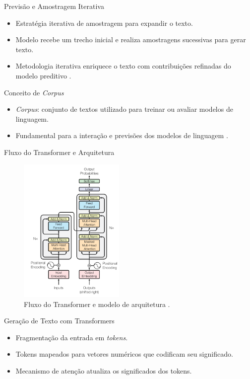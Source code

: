 \documentclass{beamer}
\begin{document}
\begin{frame}{Previsão e Amostragem Iterativa}
    \begin{itemize}
        \item Estratégia iterativa de amostragem para expandir o texto.
        \item Modelo recebe um trecho inicial e realiza amostragens sucessivas para gerar texto.
        \item Metodologia iterativa enriquece o texto com contribuições refinadas do modelo preditivo \cite{holtzman2019curious}.
    \end{itemize}
\end{frame}

\begin{frame}{Conceito de \textit{Corpus}}
    \begin{itemize}
        \item \textit{Corpus}: conjunto de textos utilizado para treinar ou avaliar modelos de linguagem.
        \item Fundamental para a interação e previsões dos modelos de linguagem \cite{Foundations-of-Statistical-Natural-Language-Processing}.
    \end{itemize}
\end{frame}

\begin{frame}{Fluxo do Transformer e Arquitetura}
    \begin{figure}[!h]
        \centering
        \includegraphics[width=2in]{images/The Transformer - model architecture.png}
        \caption{Fluxo do Transformer e modelo de arquitetura \cite{Attention-Is-All-You-Need}.}
        \label{fig:arquiteturaTransformer}
    \end{figure}
\end{frame}

\begin{frame}{Geração de Texto com Transformers}
    \begin{itemize}
        \item Fragmentação da entrada em \textit{tokens}.
        \item Tokens mapeados para vetores numéricos que codificam seu significado.
        \item Mecanismo de atenção atualiza os significados dos tokens.
    \end{itemize}
\end{frame}
\end{document}
